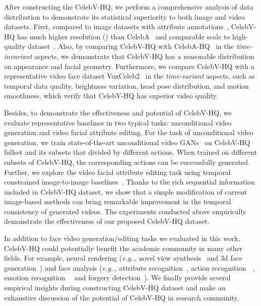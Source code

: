 \documentclass[runningheads]{llncs}
\makeatletter
\DeclareRobustCommand\onedot{\futurelet\@let@token\@onedot}
\def\@onedot{\ifx\@let@token.\else.\null\fi\xspace}
\def\eg{\emph{e.g}\onedot} \def\Eg{\emph{E.g}\onedot}
\makeatother
\begin{document}
After constructing the CelebV-HQ, we perform a comprehensive analysis of data distribution to demonstrate its statistical superiority to both image and video datasets. 
First, compared to image datasets with attribute annotations~\cite{celeba15,celebahq}, CelebV-HQ has much higher resolution () than CelebA~\cite{celeba15} and comparable scale to high-quality dataset~\cite{celebahq}. Also, by comparing CelebV-HQ with CelebA-HQ~\cite{celebahq} in the \textit{time-invariant} aspects, we demonstrate that CelebV-HQ has a reasonable distribution on appearance and facial geometry.
Furthermore, we compare CelebV-HQ with a representative video face dataset VoxCeleb2~\cite{vox2} in the \textit{time-variant} aspects, such as temporal data quality, brightness variation, head pose distribution, and motion smoothness, which verify that CelebV-HQ has superior video quality.



Besides, to demonstrate the effectiveness and potential of CelebV-HQ, we evaluate representative baselines in two typical tasks: unconditional video generation and video facial attribute editing.
For the task of unconditional video generation, we train state-of-the-art unconditional video GANs~\cite{mocoganhd,digan} on CelebV-HQ fullset and its subsets that divided by different actions. When trained on different subsets of CelebV-HQ, the corresponding actions can be successfully generated.
Further, we explore the video facial attribute editing task using temporal constrained image-to-image baselines~\cite{munit,starganv2}. Thanks to the rich sequential information included in CelebV-HQ dataset, we show that a simple modification of current image-based methods can bring remarkable improvement in the temporal consistency of generated videos. The experiments conducted above empirically demonstrate the effectiveness of our proposed CelebV-HQ dataset.


In addition to face video generation/editing tasks we evaluated in this work, CelebV-HQ could potentially benefit the academic community in many other fields. For example, neural rendering (\eg, novel view synthesis~\cite{headnerf,stylenerf,or2021stylesdf} and 3d face generation~\cite{chan2021pigan,or2021stylesdf,eg3d,guo2021adnerf,Gafni_2021_CVPR,chen2022sem2nerf}) and face analysis (\eg, attribute recognition~\cite{zhong2016face,ding2018deep,fairface}, action recognition~~\cite{wang2013action,jegham2020vision}, emotion recognition~~\cite{dzedzickis2020human,lee2019context} and forgery detection~\cite{li2020face,haliassos2021lips,zhu2021face}). We finally provide several empirical insights during constructing CelebV-HQ dataset and make an exhaustive discussion of the potential of CelebV-HQ in research community.
\end{document}
